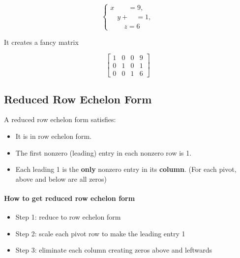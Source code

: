 \documentclass[11pt]{article}
\theoremstyle{definition}
\begin{document}
\[
\begin{cases}
x \quad \quad= 9,\\
\quad y + \quad= 1,\\
\quad \quad z = 6
\end{cases}
\]

It creates a fancy matrix

\[
\left[
\begin{array}{ccc|c}
    1 & 0 & 0& 9 \\
    0 & 1 & 0 & 1 \\
    0 & 0 & 1 & 6
\end{array}
\right]
\]

\subsection{Reduced Row Echelon Form}
A reduced row echelon form satisfies:
\begin{itemize}
    \item It is in row echelon form.
    \item The first nonzero (leading) entry in each nonzero row is 1.
    \item Each leading 1 is the \textbf{only} nonzero entry in its \textbf{column}. (For each pivot, above and below are all zeros)
\end{itemize}

\paragraph{How to get reduced row echelon form}

\begin{itemize}
    \item Step 1: reduce to row echelon form
    \item Step 2: scale each pivot row to make the leading entry 1
    \item Step 3: eliminate each column creating zeros above and leftwards
\end{itemize}

\vspace{0.5em}
\noindent{}
\end{document}
